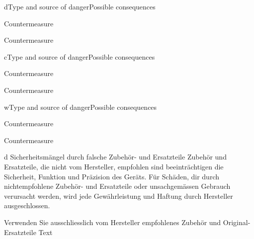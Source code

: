\documentclass[]{article}
\begin{document}
\begin{safetymessage}{d}{Type and source of danger}{Possible consequences}
\item Countermeasure
\item Countermeasure
\end{safetymessage}
\begin{safetymessage}{c}{Type and source of danger}{Possible consequences}
	\item Countermeasure
	\item Countermeasure
\end{safetymessage}
\begin{safetymessage}{w}{Type and source of danger}{Possible consequences}
	\item Countermeasure
	\item Countermeasure
\end{safetymessage}

\newpage
\begin{safetymessage}
	{d}
	{Sicherheitsmängel durch falsche Zubehör- und Ersatzteile}
	{Zubehör und Ersatzteile, die nicht vom Hersteller, empfohlen sind beeinträchtigen die Sicherheit, Funktion und Präzision des Geräts. Für Schäden, dir durch nichtempfohlene Zubehör- und Ersatzteile oder unsachgemässen Gebrauch verursacht werden, wird jede Gewährleistung und Haftung durch Hersteller ausgeschlossen.}
	\item Verwenden Sie ausschliesslich vom Hersteller empfohlenes Zubehör und Original-Ersatzteile 
	Text
\end{safetymessage}
\blindtext
{}
\blindtext
\end{document}
